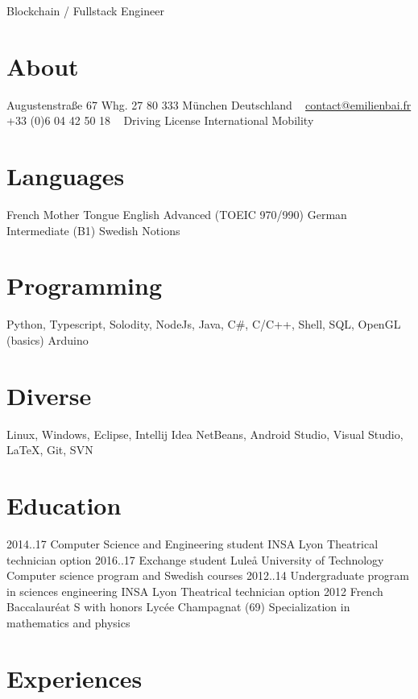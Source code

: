 \documentclass[a4paper]{friggeri-cv}
\begin{document}
       {Blockchain / Fullstack Engineer}


\begin{aside}
  \section{About}
    Augustenstraße 67
    Whg. 27
    80 333 München
    Deutschland
    ~
    \href{mailto:contact@emilienbai.fr}{contact@emilienbai.fr}
    +33 (0)6 04 42 50 18
    ~
    Driving License
    International Mobility
  \section{Languages}
  	French Mother Tongue
	English Advanced
	(TOEIC 970/990)
	German Intermediate (B1)
	Swedish Notions	
  \section{Programming}
    Python, Typescript, 
	Solodity, NodeJs,    
    Java, C\#, C/C++, 
    Shell, SQL, OpenGL (basics)
    Arduino
  \section{Diverse}
    Linux, Windows, 
    Eclipse, Intellij Idea
    NetBeans, Android Studio, 
    Visual Studio,
    \LaTeX, Git, SVN     
\end{aside}

\section{Education}

\begin{entrylist}
 \entry
    {2014..17}
    {Computer Science and Engineering student}
    {INSA Lyon}
    {Theatrical technician option }
   \entry 
	{2016..17}
	{Exchange student}
	{Luleå University of Technology}
	{Computer science program and Swedish courses}
  \entry
    {2012..14}
    {Undergraduate program in sciences engineering}
    {INSA Lyon}
    {Theatrical technician option}
  \entry
    {2012}
    {French Baccalauréat S with honors}
    {Lycée Champagnat (69)}
    {Specialization in mathematics and physics}
\end{entrylist}

\section{Experiences}
\end{document}

